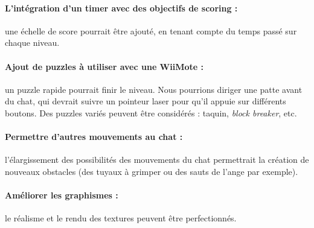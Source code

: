 \documentclass[a4paper,11pt]{article}
\begin{document}
\paragraph{L'intégration d'un timer avec des objectifs de scoring :} une échelle de score pourrait être ajouté, en tenant compte du temps passé sur chaque niveau.
\paragraph{Ajout de puzzles à utiliser avec une WiiMote :} un puzzle rapide pourrait finir le niveau. Nous pourrions diriger une patte avant du chat, qui devrait suivre un pointeur laser pour qu'il appuie sur différents boutons. Des puzzles variés peuvent être considérés : taquin, \textit{block breaker}, etc.
\paragraph{Permettre d'autres mouvements au chat :} l'élargissement des possibilités des mouvements du chat permettrait la création de nouveaux obstacles (des tuyaux à grimper ou des sauts de l'ange par exemple).
\paragraph{Améliorer les graphismes :} le réalisme et le rendu des textures peuvent être perfectionnés.
\\
\end{document}
